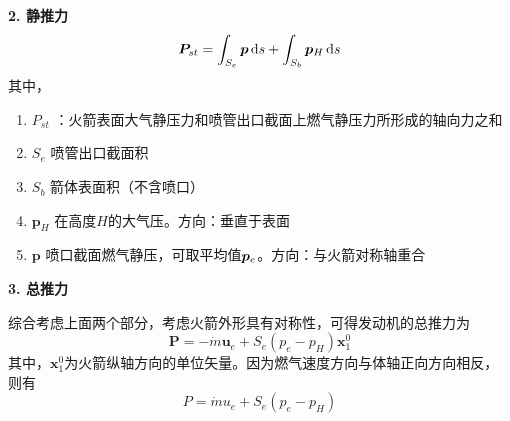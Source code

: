 \noindent \textbf{2. 静推力}
\begin{equation}
	\bm{P}_{st} = \int_{S_e} \bm{p}\, {\rm{d}} s + \int_{S_b} \bm{\bm{p}}_H \, {\rm{d}} s
	\label{静推力}
\end{equation}
其中，\vspace*{-0.5em}
\begin{enumerate}[\hspace*{2em}]
	\item $P_{st}$ \quad {}：火箭表面大气静压力和喷管出口截面上燃气静压力所形成的轴向力之和\vspace*{-0.5em}
	\item $S_e$ \quad 喷管出口截面积\vspace*{-0.5em}
	\item $S_b$ \quad 箭体表面积（不含喷口）\vspace*{-0.5em}
	\item $\bm{p}_H$ \quad 在高度$H$的大气压。方向：垂直于表面\vspace*{-0.5em}
	\item $\bm{p}$ \quad 喷口截面燃气静压，可取平均值$\bm{\bm{p}}_e$。方向：与火箭对称轴重合
\end{enumerate}

\vspace*{0.5em}

\noindent \textbf{3. 总推力}

综合考虑上面两个部分，考虑火箭外形具有对称性，可得发动机的总推力为
\begin{equation}
	\bm{P} = - \dot{m}\bm{u}_e + S_e(p_e - p_H)\bm{x}_1^0
\end{equation}
其中，$\bm{x}_1^0$为火箭纵轴方向的单位矢量。因为燃气速度方向与体轴正向方向相反，则有
\begin{equation}
	P = \dot{m}u_e + S_e(p_e - p_H)
\end{equation}

